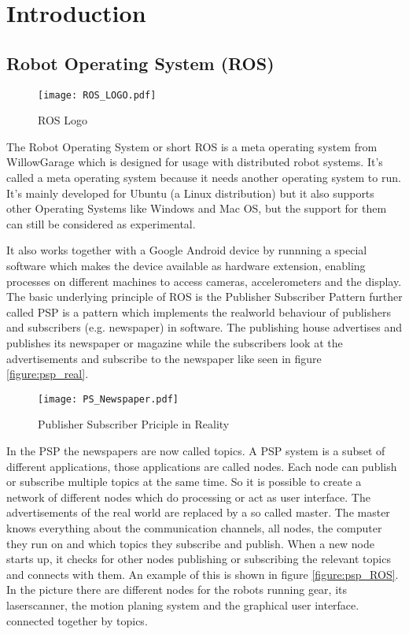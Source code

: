 \chapter{Introduction}
\graphicspath{{./Introduction/img/}}
\section{Robot Operating System (ROS)}
  
\begin{figure}[h]
	\centering
	\texttt{[image: ROS\_LOGO.pdf]}
	\caption{ROS Logo}
\end{figure} 

The Robot Operating System or short ROS is a meta operating system from WillowGarage which is designed for usage with distributed 
robot systems. It's called a meta operating system because it needs another operating system to run. It's mainly developed for Ubuntu 
(a Linux distribution) but it also supports other Operating Systems like Windows and Mac OS, but the support for them can still be considered 
as experimental. 

It also works together with a Google Android device by runnning a special software which makes the device available
as hardware extension, enabling processes on different machines to access cameras, accelerometers and the display.
The basic underlying principle of ROS is the Publisher Subscriber Pattern further called PSP is a pattern which 
implements the realworld behaviour of publishers and subscribers (e.g. newspaper) in software. 
The publishing house advertises and publishes its newspaper or magazine while the subscribers look at the advertisements
and subscribe to the newspaper like seen in figure \vref{figure:psp_real}.

\begin{figure}[h]
	\centering
	\texttt{[image: PS\_Newspaper.pdf]}
	\caption{Publisher Subscriber Priciple in Reality}
	\label{figure:psp_real}
\end{figure} 

In the PSP the newspapers are now called topics. A PSP system is a subset of different applications, those applications are called nodes.  
Each node can publish or subscribe multiple topics at the same time. So it is possible to create a network of different nodes which
do processing or act as user interface. The advertisements of the real world are replaced by a so called master. 
The master knows everything about the communication channels, all nodes, the computer they run on and 
which topics they subscribe and publish. When a new node starts up, it checks for other nodes publishing or subscribing the relevant topics
and connects with them. An example of this is shown in figure \vref{figure:psp_ROS}.
In the picture there are different nodes for the robots running gear, its laserscanner, the motion planing system and the graphical user interface.
connected together by topics.

